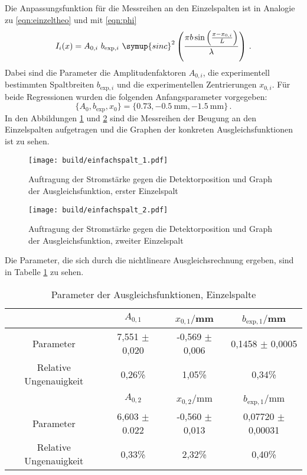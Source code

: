 Die Anpassungsfunktion für die Messreihen an den Einzelspalten ist in Analogie zu
\eqref{eqn:einzeltheo} und mit \eqref{eqn:phi}
\begin{equation*}
  I_i (x) = A_{0,i} \,\, b_{\text{exp},i} \,\, \symup{sinc}^2\left(\frac{\pi b \sin\left(\frac{x-x_{0,i}}{L}\right)}{\lambda}\right) \,.
\end{equation*}
Dabei sind die Parameter die Amplitudenfaktoren $A_{0,i}$, die experimentell bestimmten Spaltbreiten
$b_{\text{exp},i}$ und die experimentellen Zentrierungen $x_{0,i}$.
Für beide Regressionen wurden die folgenden Anfangsparameter vorgegeben:
\begin{equation*}
  \{A_0, b_{\text{exp}}, x_0\} = \{0.73, \SI{-0.5}{\milli\meter}, \SI{-1.5}{\milli\meter}\}\,.
\end{equation*}
In den Abbildungen \ref{fig:spalt1} und \ref{fig:spalt2} sind die Messreihen der Beugung an den Einzelspalten aufgetragen
und die Graphen der konkreten Ausgleichsfunktionen ist zu sehen.

\begin{figure}
  \centering
  \texttt{[image: build/einfachspalt\_1.pdf]}
  \caption{Auftragung der Stromstärke gegen die Detektorposition und Graph der Ausgleichsfunktion, erster Einzelspalt}
  \label{fig:spalt1}
\end{figure}

\begin{figure}
  \centering
  \texttt{[image: build/einfachspalt\_2.pdf]}
  \caption{Auftragung der Stromstärke gegen die Detektorposition und Graph der Ausgleichsfunktion, zweiter Einzelspalt}
  \label{fig:spalt2}
\end{figure}

Die Parameter, die sich durch die nichtlineare Ausgleichsrechnung ergeben, sind
in Tabelle \ref{tab:paramseinzel} zu sehen.

\begin{table}
\centering
\begin{tabular}{cccc}
\toprule
& $A_{0,1}$ & $x_{0,1}/$mm & $b_{\text{exp},1}/$mm \\
\midrule
Parameter & 7,551 $\pm$ 0,020 & -0,569 $\pm$ 0,006 & 0,1458 $\pm$ 0,0005 \\
Relative Ungenauigkeit & 0,26\% & 1,05\% & 0,34\%\\
\toprule
& $A_{0,2}$ & $x_{0,2}/$mm & $b_{\text{exp},1}/$mm \\
\midrule
Parameter & 6,603 $\pm$ 0.022 & -0,560 $\pm$ 0,013 & 0,07720 $\pm$ 0,00031 \\
Relative Ungenauigkeit & 0,33\% & 2,32\% & 0,40\%\\
\bottomrule
\end{tabular}
\caption{Parameter der Ausgleichsfunktionen, Einzelspalte}
\label{tab:paramseinzel}
\end{table}

